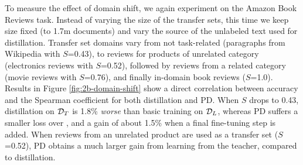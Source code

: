 To measure the effect of domain shift, we again experiment on the Amazon Book Reviews task. Instead of varying the size of the transfer sets, this time we keep size fixed (to 1.7m documents) and vary the source of the unlabeled text used for distillation. Transfer set domains vary from not task-related (paragraphs from Wikipedia with $S$=0.43), to reviews for products of unrelated category (electronics reviews with $S$=0.52), followed by reviews from a related category (movie reviews with $S$=0.76), and finally in-domain book reviews ($S$=1.0). Results in Figure \ref{fig:2b-domain-shift} show a direct correlation between accuracy and the Spearman coefficient for both distillation and PD. When $S$ drops to 0.43, distillation on $\mathcal{D}_{T}$ is 1.8\% \emph{worse} than basic training on $\mathcal{D}_{L}$, whereas PD suffers a smaller loss over \ptft, and a gain of about 1.5\% when a final fine-tuning step is added.  When reviews from an unrelated product are used as a transfer set ($S$=0.52), PD obtains a much larger gain from learning from the teacher, compared to distillation.


